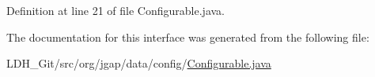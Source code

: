 Definition at line 21 of file Configurable.\-java.



The documentation for this interface was generated from the following file\-:\begin{DoxyCompactItemize}
\item 
L\-D\-H\-\_\-\-Git/src/org/jgap/data/config/\hyperlink{_configurable_8java}{Configurable.\-java}\end{DoxyCompactItemize}
